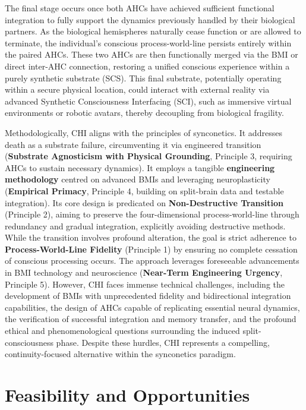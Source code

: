 \documentclass[10pt]{article}
\begin{document}
\begin{sloppypar}
  The final stage occurs once both AHCs have achieved sufficient functional integration to fully support the dynamics previously handled by their biological partners. As the biological hemispheres naturally cease function or are allowed to terminate, the individual’s conscious process-world-line persists entirely within the paired AHCs. These two AHCs are then functionally merged via the BMI or direct inter-AHC connection, restoring a unified conscious experience within a purely synthetic substrate (SCS). This final substrate, potentially operating within a secure physical location, could interact with external reality via advanced Synthetic Consciousness Interfacing (SCI), such as immersive virtual environments or robotic avatars, thereby decoupling from biological fragility.

  Methodologically, CHI aligns with the principles of synconetics. It addresses death as a substrate failure, circumventing it via engineered transition (\textbf{Substrate Agnosticism with Physical Grounding}, Principle 3, requiring AHCs to sustain necessary dynamics). It employs a tangible \textbf{engineering methodology} centred on advanced BMIs and leveraging neuroplasticity (\textbf{Empirical Primacy}, Principle 4, building on split-brain data and testable integration). Its core design is predicated on \textbf{Non-Destructive Transition} (Principle 2), aiming to preserve the four-dimensional process-world-line through redundancy and gradual integration, explicitly avoiding destructive methods. While the transition involves profound alteration, the goal is strict adherence to \textbf{Process-World-Line Fidelity} (Principle 1) by ensuring no complete cessation of conscious processing occurs. The approach leverages foreseeable advancements in BMI technology and neuroscience (\textbf{Near-Term Engineering Urgency}, Principle 5). However, CHI faces immense technical challenges, including the development of BMIs with unprecedented fidelity and bidirectional integration capabilities, the design of AHCs capable of replicating essential neural dynamics, the verification of successful integration and memory transfer, and the profound ethical and phenomenological questions surrounding the induced split-consciousness phase. Despite these hurdles, CHI represents a compelling, continuity-focused alternative within the synconetics paradigm.

  \section{Feasibility and Opportunities}
  \label{sec:feasibility}


\end{sloppypar}
\end{document}
